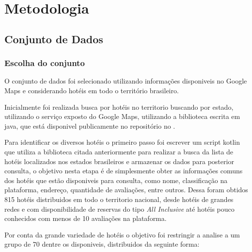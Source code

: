 \chapter{Metodologia}
\label{cap:metodologia}

\section{Conjunto de Dados}

\subsection{Escolha do conjunto}

O conjunto de dados foi selecionado utilizando informações disponiveis no Google Maps e considerando hotéis em todo o território brasileiro.

Inicialmente foi realizada busca por hotéis no territorio buscando por estado, utilizando o serviço exposto do Google Maps, utilizando a biblioteca escrita em java,  que está disponivel publicamente no repositório no .

Para identificar os diversos hotéis o primeiro passo foi escrever um script kotlin  que utiliza a biblioteca citada anteriormente para realizar a busca da lista de hotéis localizados nos estados brasileiros e armazenar os dados para posterior consulta, o objetivo nesta etapa é de simplesmente obter as informações comuns dos hotéis que estão disponiveis para consulta, como nome, classificação na plataforma, endereço, quantidade de avaliações, entre outros. Dessa foram obtidos 815 hotéis distribuidos em todo o territorio nacional, desde hotéis de grandes redes e com disponibilidade de reservas do tipo \emph{All Inclusive} até hotéis pouco conhecidos com menos de 10 avaliações na plataforma.


Por conta da grande variedade de hotéis o objetivo foi restringir a analise a um grupo de 70 dentre os disponiveis, distribuidos da seguinte forma:

